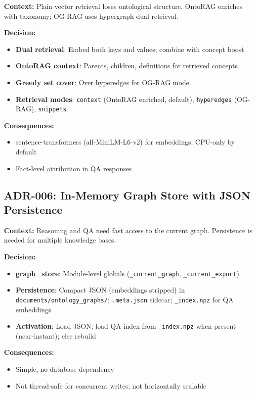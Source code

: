 \documentclass[11pt,a4paper]{article}
\begin{document}
\textbf{Context:} Plain vector retrieval loses ontological structure. OntoRAG enriches with taxonomy; OG-RAG uses hypergraph dual retrieval.

\textbf{Decision:}
\begin{itemize}
    \item \textbf{Dual retrieval}: Embed both keys and values; combine with concept boost
    \item \textbf{OntoRAG context}: Parents, children, definitions for retrieved concepts
    \item \textbf{Greedy set cover}: Over hyperedges for OG-RAG mode
    \item \textbf{Retrieval modes}: \texttt{context} (OntoRAG enriched, default), \texttt{hyperedges} (OG-RAG), \texttt{snippets}
\end{itemize}

\textbf{Consequences:}
\begin{itemize}
    \item sentence-transformers (all-MiniLM-L6-v2) for embeddings; CPU-only by default
    \item Fact-level attribution in QA responses
\end{itemize}

\subsection{ADR-006: In-Memory Graph Store with JSON Persistence}
\label{sec:adr-storage}

\textbf{Context:} Reasoning and QA need fast access to the current graph. Persistence is needed for multiple knowledge bases.

\textbf{Decision:}
\begin{itemize}
    \item \textbf{graph\_store}: Module-level globals (\texttt{\_current\_graph}, \texttt{\_current\_export})
    \item \textbf{Persistence}: Compact JSON (embeddings stripped) in \texttt{documents/ontology\_graphs/}; \texttt{.meta.json} sidecar; \texttt{\_index.npz} for QA embeddings
    \item \textbf{Activation}: Load JSON; load QA index from \texttt{\_index.npz} when present (near-instant); else rebuild
\end{itemize}

\textbf{Consequences:}
\begin{itemize}
    \item Simple, no database dependency
    \item Not thread-safe for concurrent writes; not horizontally scalable
\end{itemize}
\end{document}
